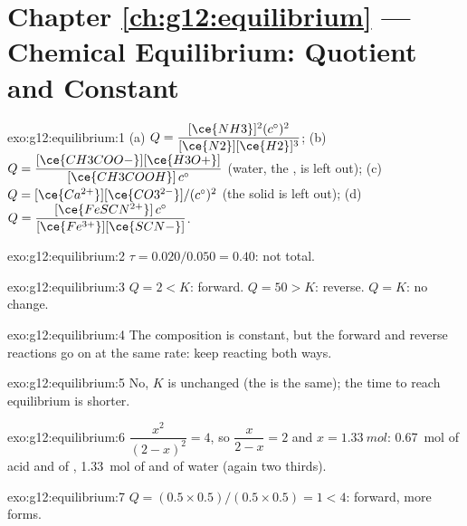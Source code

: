 \section*{Chapter \ref{ch:g12:equilibrium} --- Chemical Equilibrium: Quotient and Constant}

\begin{solution}{exo:g12:equilibrium:1}
(a) $Q = \dfrac{[\ce{NH3}]^2 (c^\circ)^2}{[\ce{N2}][\ce{H2}]^3}$;
(b) $Q = \dfrac{[\ce{CH3COO-}][\ce{H3O+}]}{[\ce{CH3COOH}]\,c^\circ}$ (water,
the , is left out);
(c) $Q = [\ce{Ca^{2+}}][\ce{CO3^{2-}}]/(c^\circ)^2$ (the solid is left out);
(d) $Q = \dfrac{[\ce{FeSCN^{2+}}]\,c^\circ}{[\ce{Fe^{3+}}][\ce{SCN-}]}$.
\end{solution}

\begin{solution}{exo:g12:equilibrium:2}
$\tau = 0.020/0.050 = 0.40$: not total.
\end{solution}

\begin{solution}{exo:g12:equilibrium:3}
$Q = 2 < K$: forward. $Q = 50 > K$: reverse. $Q = K$: no change.
\end{solution}

\begin{solution}{exo:g12:equilibrium:4}
The composition is constant, but the forward and reverse reactions go on
at the same rate:  keep reacting both ways.
\end{solution}

\begin{solution}{exo:g12:equilibrium:5}
No, $K$ is unchanged (the  is the same); the time to reach
equilibrium is shorter.
\end{solution}

\begin{solution}{exo:g12:equilibrium:6}
$\dfrac{x^2}{(2-x)^2} = 4$, so $\dfrac{x}{2-x} = 2$ and
$x = \qty{1.33}{mol}$: \qty{0.67}{mol} of acid and of ,
\qty{1.33}{mol} of  and of water (again two thirds).
\end{solution}

\begin{solution}{exo:g12:equilibrium:7}
$Q = (0.5 \times 0.5)/(0.5 \times 0.5) = 1 < 4$: forward, more 
forms.
\end{solution}

